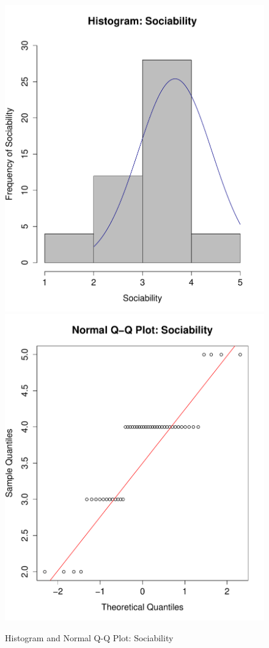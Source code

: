 \begin{figure}[H]
\caption{Histogram and Normal Q-Q Plot: Sociability}
\centering
\includegraphics[scale=0.35]{./img/hist_sociability.pdf}
\includegraphics[scale=0.35]{./img/qqplot_sociability.pdf}
\end{figure}

